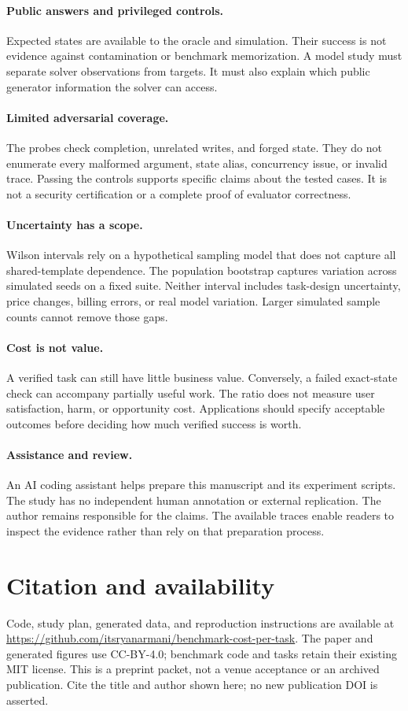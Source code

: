 \documentclass{article}
\begin{document}
\paragraph{Public answers and privileged controls.} Expected states are available to the oracle and simulation. Their success is not evidence against contamination or benchmark memorization. A model study must separate solver observations from targets. It must also explain which public generator information the solver can access.
\paragraph{Limited adversarial coverage.} The probes check completion, unrelated writes, and forged state. They do not enumerate every malformed argument, state alias, concurrency issue, or invalid trace. Passing the controls supports specific claims about the tested cases. It is not a security certification or a complete proof of evaluator correctness.
\paragraph{Uncertainty has a scope.} Wilson intervals rely on a hypothetical sampling model that does not capture all shared-template dependence. The population bootstrap captures variation across simulated seeds on a fixed suite. Neither interval includes task-design uncertainty, price changes, billing errors, or real model variation. Larger simulated sample counts cannot remove those gaps.
\paragraph{Cost is not value.} A verified task can still have little business value. Conversely, a failed exact-state check can accompany partially useful work. The ratio does not measure user satisfaction, harm, or opportunity cost. Applications should specify acceptable outcomes before deciding how much verified success is worth.
\paragraph{Assistance and review.} An AI coding assistant helps prepare this manuscript and its experiment scripts. The study has no independent human annotation or external replication. The author remains responsible for the claims. The available traces enable readers to inspect the evidence rather than rely on that preparation process.
\section{Citation and availability}
Code, study plan, generated data, and reproduction instructions are available at \url{https://github.com/itsryanarmani/benchmark-cost-per-task}. The paper and generated figures use CC-BY-4.0; benchmark code and tasks retain their existing MIT license. This is a preprint packet, not a venue acceptance or an archived publication. Cite the title and author shown here; no new publication DOI is asserted.\par
\end{document}
